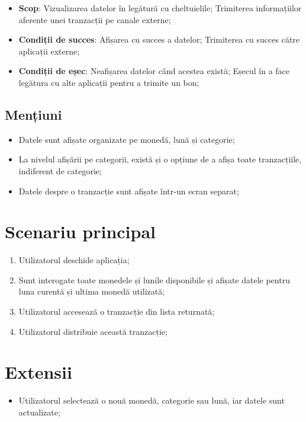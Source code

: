 \begin{itemize}
  \item \textbf{Scop}: Vizualizarea datelor în legătură cu cheltuielile; Trimiterea informațiilor aferente unei tranzacții pe canale externe;
  \item \textbf{Condiții de succes}: Afișarea cu succes a datelor; Trimiterea cu succes către aplicații externe;
  \item \textbf{Condiții de eșec}: Neafișarea datelor când acestea există; Eșecul în a face legătura cu alte aplicații pentru a trimite un bon;
\end{itemize}

\subsection*{Mențiuni}

\begin{itemize}
  \item Datele sunt afișate organizate pe monedă, lună și categorie;
  \item La nivelul afișării pe categorii, există și o opțiune de a afișa toate tranzacțiile, indiferent de categorie;
  \item Datele despre o tranzacție sunt afișate într-un ecran separat;
\end{itemize}

\section*{Scenariu principal}
\begin{enumerate}
  \item Utilizatorul deschide aplicația;
  \item Sunt interogate toate monedele și lunile disponibile și afișate datele pentru luna curentă și ultima monedă utilizată;
  \item Utilizatorul accesează o tranzacție din lista returnată;
  \item Utilizatorul distribuie această tranzacție;
\end{enumerate}

\section*{Extensii}
\begin{itemize}
  \item Utilizatorul selectează o nouă monedă, categorie sau lună, iar datele sunt actualizate;
\end{itemize}